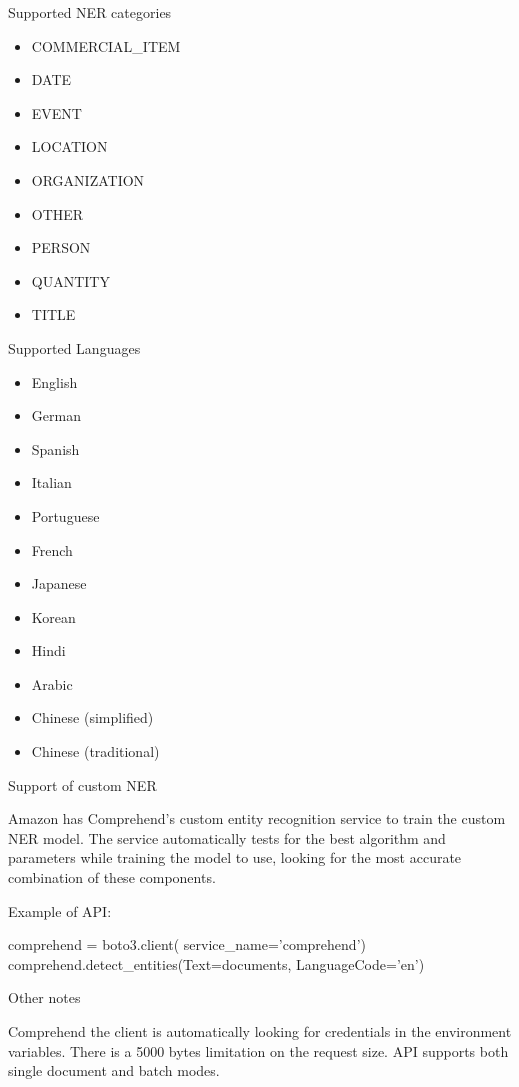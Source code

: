 \documentclass[conference]{IEEEtran}
\begin{document}
Supported NER categories

\begin{itemize}
	\item COMMERCIAL\_ITEM
	\item DATE
	\item EVENT
	\item LOCATION
	\item ORGANIZATION
	\item OTHER
	\item PERSON
	\item QUANTITY
	\item TITLE
\end{itemize}

Supported Languages

\begin{itemize}
	\item English
	\item German
	\item Spanish
	\item Italian
	\item Portuguese
	\item French
	\item Japanese
	\item Korean
	\item Hindi
	\item Arabic
	\item Chinese (simplified)
	\item Chinese (traditional)
\end{itemize}

Support of custom NER

Amazon has Comprehend's custom entity recognition service to train the custom NER model. The service automatically tests for the best algorithm and parameters while training the model to use, looking for the most accurate combination of these components.

Example of API:

\begin{verbatimtab}[4]
comprehend = boto3.client(
	service_name='comprehend')
comprehend.detect_entities(Text=documents, 
	LanguageCode='en')
\end{verbatimtab}

Other notes

Comprehend the client is automatically looking for credentials in the environment variables. There is a 5000 bytes limitation on the request size. API supports both single document and batch modes.
\end{document}
